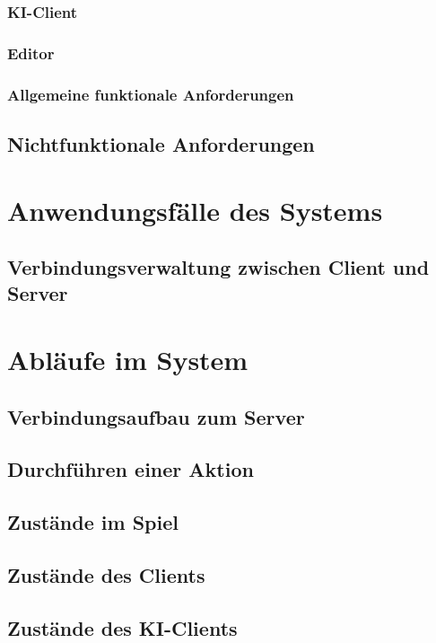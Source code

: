 \documentclass{uulm-assignment}
\begin{document}
\clearpage
\subsubsection{KI-Client}

\subsubsection{Editor}


\clearpage
\subsubsection{Allgemeine funktionale Anforderungen}


\clearpage
\subsection{Nichtfunktionale Anforderungen}


\clearpage
{}
\section{Anwendungsfälle des Systems}
\subsection{Verbindungsverwaltung zwischen Client und Server}



\section{Abläufe im System}
\subsection{Verbindungsaufbau zum Server}


\clearpage
\subsection{Durchführen einer Aktion}


\subsection{Zustände im Spiel}

\clearpage

\clearpage
\subsection{Zustände des Clients}


\subsection{Zustände des KI-Clients}

\end{document}
